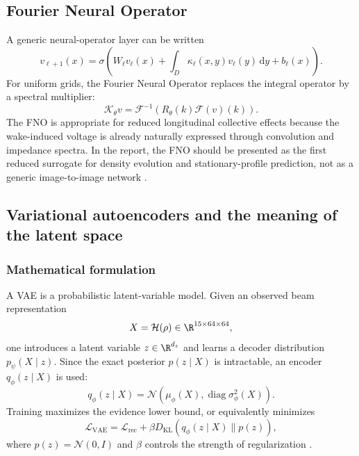 \documentclass[11pt,a4paper]{article}
\providecommand{\dd}{\,\mathrm{d}}
\providecommand{\KL}{D_{\mathrm{KL}}}
\begin{document}
\begin{sloppypar}
\subsection{Fourier Neural Operator}
A generic neural-operator layer can be written
\begin{equation}
    v_{\ell+1}(x)
    =
    \sigma\left(
    W_{\ell}v_{\ell}(x)
    +
    \int_D\kappa_{\ell}(x,y)v_{\ell}(y)\dd y
    +
    b_{\ell}(x)
    \right).
    \label{eq:generic_no_layer_v2}
\end{equation}
For uniform grids, the Fourier Neural Operator replaces the integral operator by a spectral multiplier:
\begin{equation}
    \mathcal{K}_{\theta}v
    =
    \mathcal{F}^{-1}
    \left(
    R_{\theta}(k)\mathcal{F}(v)(k)
    \right).
    \label{eq:fno_operator_v2}
\end{equation}
The FNO is appropriate for reduced longitudinal collective effects because the wake-induced voltage is already naturally expressed through convolution and impedance spectra. In the report, the FNO should be presented as the first reduced surrogate for density evolution and stationary-profile prediction, not as a generic image-to-image network \cite{kovachki_neural_2023}.

\subsection{Variational autoencoders and the meaning of the latent space}
\subsubsection{Mathematical formulation}
A VAE is a probabilistic latent-variable model. Given an observed beam representation
\begin{equation}
    X=\mathcal{H}(\rho)\in\R^{15\times64\times64},
\end{equation}
one introduces a latent variable $z\in\R^{d_z}$ and learns a decoder distribution $p_{\psi}(X\mid z)$. Since the exact posterior $p(z\mid X)$ is intractable, an encoder $q_{\phi}(z\mid X)$ is used:
\begin{equation}
    q_{\phi}(z\mid X)
    =
    \mathcal{N}\left(\mu_{\phi}(X),\operatorname{diag}\sigma_{\phi}^{2}(X)\right).
\end{equation}
Training maximizes the evidence lower bound, or equivalently minimizes
\begin{equation}
    \mathcal{L}_{\mathrm{VAE}}
    =
    \mathcal{L}_{\mathrm{rec}}
    +
    \beta\KL\left(q_{\phi}(z\mid X)\|p(z)\right),
    \label{eq:vae_loss_v2}
\end{equation}
where $p(z)=\mathcal{N}(0,I)$ and $\beta$ controls the strength of regularization \cite{kingma_autoencoding_2014}.


\end{sloppypar}
\end{document}
